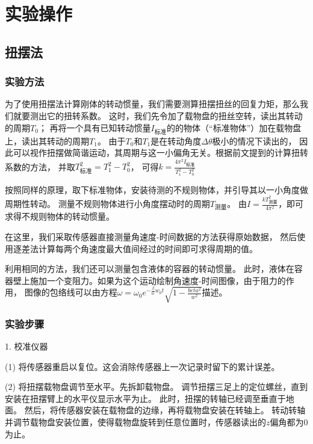 \documentclass[12pt,hyperref,a4paper,UTF8]{ctexart}
\begin{document}
\section{实验操作}
\subsection{扭摆法}
\subsubsection{实验方法}

为了使用扭摆法计算刚体的转动惯量，我们需要测算扭摆扭丝的回复力矩，那么我们就要测出它的扭转系数。
这时，我们先令加了载物盘的扭丝空转，读出其转动的周期$ T_0 $；
再将一个具有已知转动惯量$ I_{\text{标准}} $的的物体（“标准物体”）加在载物盘上，读出其转动的周期$ T_1 $。
由于$ T_0 $和$ T_1 $是在转动角度$ \Delta \theta $极小的情况下读出的，
因此可以视作扭摆做简谐运动，其周期与这一小偏角无关。根据前文提到的计算扭转系数的方法，
并取$ T_{\text{标准}}^2 = T_1^2 - T_0^2 $，
可得$ k = \frac{4\pi^2 I_{\text{标准}}}{T_1^2 - T_0^2} $

按照同样的原理，取下标准物体，安装待测的不规则物体，并引导其以一小角度做周期性转动。
测量不规则物体进行小角度摆动时的周期$ T_{\text{测量}} $。
由$ I = \frac{k T_{\text{测量}}^2}{4\pi^2} $，即可求得不规则物体的转动惯量。

在这里，我们采取传感器直接测量角速度-时间数据的方法获得原始数据，
然后使用逐差法计算每两个角速度最大值间经过的时间即可求得周期的值。

利用相同的方法，我们还可以测量包含液体的容器的转动惯量。
此时，液体在容器壁上施加一个变阻力。如果为这个运动绘制角速度-时间图像，由于阻力的作用，
图像的包络线可以由方程$ \omega = \omega_0 e^{- \frac{\beta}{w} w_0 t} \sqrt{1 - \frac{beta^2}{w^2}} $描述。

\subsubsection{实验步骤}

1. 校准仪器

(1) 将传感器重启以复位。这会消除传感器上一次记录时留下的累计误差。

(2) 将扭摆载物盘调节至水平。先拆卸载物盘。
调节扭摆三足上的定位螺丝，直到安装在扭摆臂上的水平仪显示水平为止。
此时，扭摆的转轴已经调至垂直于地面。
然后，将传感器安装在载物盘的边缘，再将载物盘安装在转轴上。
转动转轴并调节载物盘安装位置，使得载物盘旋转到任意位置时，传感器读出的$ z $偏角都为0为止。
\end{document}
